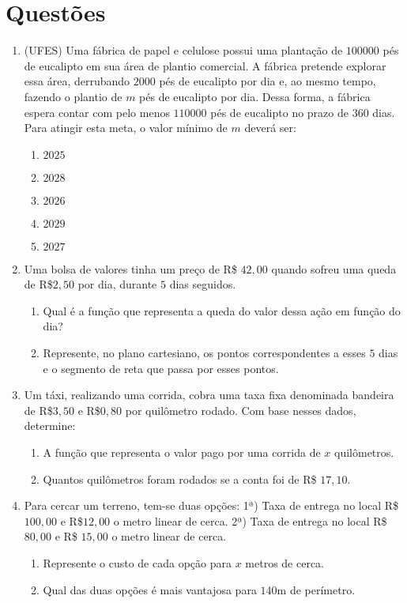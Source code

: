 \section{Questões}

 \begin{enumerate}
  \item (UFES) Uma fábrica de papel e celulose possui uma plantação de $100000$ pés de eucalipto em sua área de plantio comercial. 
  A fábrica pretende explorar essa área, derrubando $2000$ pés de eucalipto por dia e, ao mesmo tempo, fazendo o plantio de $m$ pés 
  de eucalipto por dia. Dessa forma, a fábrica espera contar com pelo menos $110000$ pés de eucalipto no prazo de $360$ dias. 
  Para atingir esta meta, o valor mínimo de $m$ deverá ser:
  \begin{enumerate}
  \item $2025$
  \item $2028$
  \item $2026$
  \item $2029$
  \item $2027$
  \end{enumerate}
  
  \item Uma bolsa de valores tinha um preço de R\$ $42,00$ quando sofreu uma queda de R\$$2,50$ por dia, durante $5$ dias seguidos.
  \begin{enumerate}
  \item Qual é a função que representa a queda do valor dessa ação em função do dia?
  \item Represente, no plano cartesiano, os pontos correspondentes a esses $5$ dias e o segmento de reta que passa por esses pontos.
  \end{enumerate}
  
  \item Um táxi, realizando uma corrida, cobra uma taxa fixa denominada bandeira de R\$$3,50$ e R\$$0,80$ por quilômetro rodado. 
  Com base nesses dados, determine:
  \begin{enumerate}
  \item A função que representa o valor pago por uma corrida de $x$ quilômetros.
  \item Quantos quilômetros foram rodados se a conta foi de R\$ $17,10$. 
  \end{enumerate}
  
  \item Para cercar um terreno, tem-se duas opções:
  1ª) Taxa de entrega no local R\$ $100,00$ e R\$$12,00$ o metro linear de cerca.
  2ª) Taxa de entrega no local R\$ $80,00$ e R\$ $15,00$ o metro linear de cerca.
  \begin{enumerate}
  \item Represente o custo de cada opção para $x$ metros de cerca.
  \item Qual das duas opções é mais vantajosa para $140$m de perímetro.
  \end{enumerate}
  

\end{enumerate}
